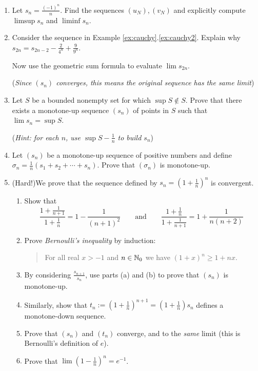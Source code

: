 \begin{exercises}{}{}
\begin{enumerate}
	
		\item Let $s_n=\frac{(-1)^n}n$. Find the sequences $(u_N),(v_N)$ and explicitly compute $\limsup s_n$ and $\liminf s_n$.
	  
	  
	  \item\label{exs:cauchygeomeval} Consider the sequence in Example \ref*{ex:cauchy}.\ref{ex:cauchy2}. Explain why $s_{2n}=s_{2n-2}-\frac 2{4^n}+\frac 9{9^n}$.\par
	  Now use the geometric sum formula to evaluate $\lim s_{2n}$.\par
	  (\emph{Since $(s_n)$ converges, this means the original sequence has the same limit})
	  
	  
	  \item%
	  Let $S$ be a bounded nonempty set for which $\sup S\notin S$. Prove that there exists a monotone-up sequence $(s_n)$ of points in $S$ such that $\lim s_n=\sup S$.\par
	  (\emph{Hint: for each $n$, use $\sup S-\frac 1n$ to build $s_n$})
	  
	  
	  \item%
	  Let $(s_n)$ be a monotone-up sequence of positive numbers and define $\sigma_n=\frac 1n(s_1+s_2+\cdots+s_n)$. Prove that $(\sigma_n)$ is monotone-up.
	
	  
	  
	  \item\label{exs:edefn} (Hard!)\lstsp We prove that the sequence defined by $s_n=\left(1+\frac 1n\right)^n$ is convergent.
	  \begin{enumerate}
	    \item Show that
	    \[
	    	\frac{1+\frac 1{n+1}}{1+\frac 1n}=1-\frac 1{(n+1)^2}
	    	\qquad\text{and}\qquad 
	    	\frac{1+\frac 1n}{1+\frac 1{n+1}}=1+\frac 1{n(n+2)}
	    \]
		  \item Prove \emph{Bernoulli's inequality} by induction:
		  \begin{quote}
		  	For all real $x>-1$ and $n\in\mathbb{N}_0$ we have $(1+x)^n\ge 1+nx$.
		  \end{quote}
			\item By considering $\frac{s_{n+1}}{s_n}$, use parts (a) and (b) to prove that $(s_n)$ is monotone-up. 
			\item Similarly, show that $t_n:=\left(1+\frac 1n\right)^{n+1} =\left(1+\frac 1n\right)s_n$ defines a monotone-down sequence.
			\item Prove that $(s_n)$ and $(t_n)$ converge, and to the \emph{same} limit (this is Bernoulli's definition of $e$).%
			\item Prove that $\lim(1-\frac 1n)^n=e^{-1}$.
		\end{enumerate}
	  
	\end{enumerate}
\end{exercises}

